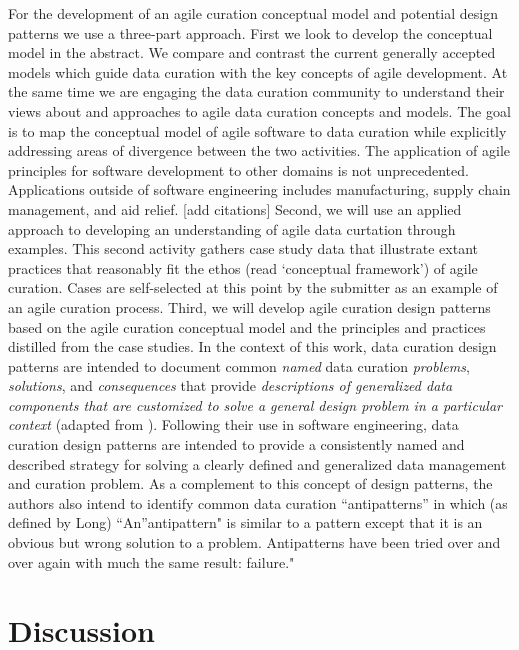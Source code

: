 \documentclass[paper]{ijdc-v9}
\begin{document}
For the development of an agile curation conceptual model and potential
design patterns we use a three-part approach. First we look to develop
the conceptual model in the abstract. We compare and contrast the
current generally accepted models which guide data curation with the key
concepts of agile development. At the same time we are engaging the data
curation community to understand their views about and approaches to
agile data curation concepts and models. The goal is to map the
conceptual model of agile software to data curation while explicitly
addressing areas of divergence between the two activities. The
application of agile principles for software development to other
domains is not unprecedented. Applications outside of software
engineering includes manufacturing, supply chain management, and aid
relief. {[}add citations{]} Second, we will use an applied approach to
developing an understanding of agile data curtation through examples.
This second activity gathers case study data that illustrate extant
practices that reasonably fit the ethos (read `conceptual framework') of
agile curation. Cases are self-selected at this point by the submitter
as an example of an agile curation process. Third, we will develop agile
curation design patterns based on the agile curation conceptual model
and the principles and practices distilled from the case studies. In the
context of this work, data curation design patterns are intended to
document common \emph{named} data curation \emph{problems},
\emph{solutions}, and \emph{consequences} that provide
\emph{descriptions of generalized data components that are customized to
solve a general design problem in a particular context} (adapted from
\autocite[section 1.1]{gamma_design_1995}). Following their use in
software engineering, data curation design patterns are intended to
provide a consistently named and described strategy for solving a
clearly defined and generalized data management and curation problem. As
a complement to this concept of design patterns, the authors also intend
to identify common data curation ``antipatterns'' in which (as defined
by Long) ``An''antipattern" is similar to a pattern except that it is an
obvious but wrong solution to a problem. Antipatterns have been tried
over and over again with much the same result: failure." \autocite[pg.
68]{long_software_2001}

\section{Discussion}\label{discussion}
\end{document}

